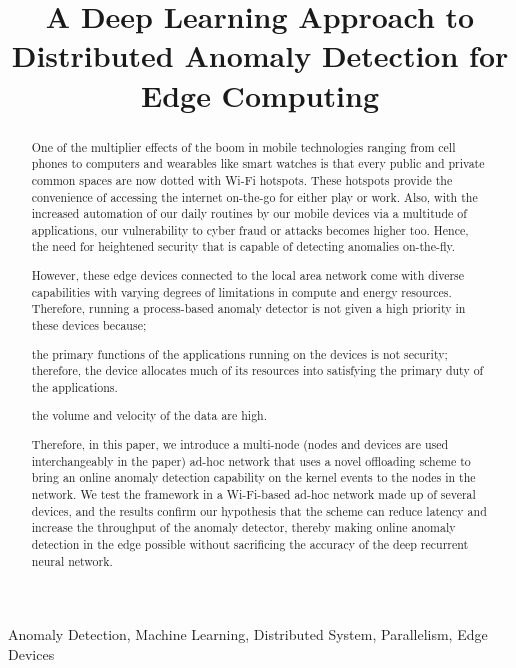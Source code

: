 \documentclass[conference]{IEEEtran}
\begin{document}
\title{A Deep Learning Approach to Distributed Anomaly 
Detection for Edge Computing
}

\author{
	}


\maketitle

\begin{abstract}
One of the multiplier effects of the boom in mobile 
technologies ranging from cell phones to computers and 
wearables like smart watches is that every public and private 
common spaces are now dotted with Wi-Fi hotspots. These 
hotspots provide the convenience of accessing the internet 
on-the-go for either play or work. Also, with the increased 
automation of our daily routines by our mobile devices via a 
multitude of applications, our vulnerability to cyber fraud 
or attacks becomes higher too. Hence, the need for heightened 
security that is capable of detecting anomalies on-the-fly. 
\par 
However, these edge devices connected to the local area 
network come with diverse capabilities with varying degrees 
of limitations in compute and energy resources. Therefore, 
running a process-based anomaly detector is not given a high 
priority in these devices because; 
\begin{enumerate*}[label={\alph*)},font={\bfseries}]
	\item the primary functions of the applications running 
	on the devices is not security; therefore, the device 
	allocates much of its resources into satisfying the 
	primary duty of the applications.
	\item the volume and velocity of the data are high.
\end{enumerate*}
Therefore, in this paper, we introduce a multi-node (nodes 
and devices are used interchangeably in the paper) ad-hoc 
network that uses a novel offloading scheme to bring an 
online anomaly detection capability on the kernel events to 
the nodes in the network. We test the framework in a Wi-Fi-based ad-hoc network made up of several devices, and the 
results confirm our hypothesis that the scheme can reduce 
latency and increase the throughput of the anomaly detector, 
thereby making online anomaly detection in the edge possible 
without sacrificing the accuracy of the deep recurrent neural 
network.
\end{abstract}

\begin{IEEEkeywords}
Anomaly Detection, Machine Learning, Distributed System, 
Parallelism, Edge Devices
\end{IEEEkeywords}




\end{document}
